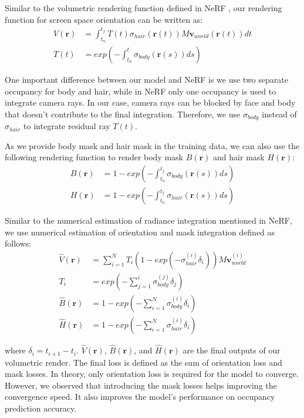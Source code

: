 \documentclass{article}
\begin{document}
Similar to the volumetric rendering function defined in NeRF \cite{mildenhall_nerf_2020}, our rendering function for screen space orientation can be written as:
\begin{align}
	V(\mathbf{r}) & = \int_{t_{n}}^{t_{f}} T(t) \sigma_{hair}(\mathbf{r}(t)) M \mathbf{v}_{world}(\mathbf{r}(t)) dt \\
	T(t) & = exp(-\int_{t_{n}}^{t} \sigma_{body}(\mathbf{r}(s)) ds)
\end{align}

One important difference between our model and NeRF is we use two separate occupancy for body and hair, while in NeRF only one occupancy is used to integrate camera rays. In our case, camera rays can be blocked by face and body that doesn't contribute to the final integration. Therefore, we use $\sigma_{body}$ instead of $\sigma_{hair}$ to integrate residual ray $T(t)$.

As we provide body mask and hair mask in the training data, we can also use the following rendering function to render body mask $B(\mathbf{r})$ and hair mask $H(\mathbf{r})$:
\begin{align}
	B(\mathbf{r}) & = 1 - exp(-\int_{t_{n}}^{t_{f}} \sigma_{body}(\mathbf{r}(s)) ds) \\
	H(\mathbf{r}) & = 1 - exp(-\int_{t_{n}}^{t_{f}} \sigma_{hair}(\mathbf{r}(s)) ds)
\end{align}

Similar to the numerical estimation of radiance integration mentioned in NeRF, we use numerical estimation of orientation and mask integration defined as follows:
\begin{align}
	\hat{V}(\mathbf{r}) & = \sum_{i=1}^{N} T_{i} (1 - exp(-\sigma_{hair}^{(i)} \delta_{i})) M \mathbf{v}_{world}^{(i)} \\
	T_{i} & = exp(-\sum_{j=1}^{i} \sigma_{body}^{(j)} \delta_{j}) \\
	\hat{B}(\mathbf{r}) & = 1 - exp(-\sum_{i=1}^{N} \sigma_{body}^{(i)} \delta_{i}) \\
	\hat{H}(\mathbf{r}) & = 1 - exp(-\sum_{i=1}^{N} \sigma_{hair}^{(i)} \delta_{i})
\end{align}

where $\delta_{i} = t_{i + 1} - t_{i}$. $\hat{V}(\mathbf{r})$, $\hat{B}(\mathbf{r})$, and $\hat{H}(\mathbf{r})$ are the final outputs of our volumetric render. The final loss is defined as the sum of orientation loss and mask losses. In theory, only orientation loss is required for the model to converge. However, we observed that introducing the mask losses helps improving the convergence speed. It also improves the model's performance on occupancy prediction accuracy.
\end{document}
